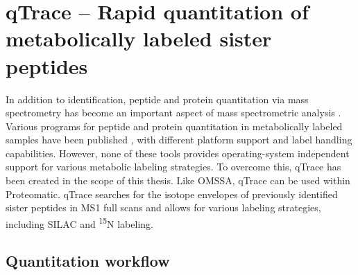 \cleardoublepage
\chapter{qTrace -- Rapid quantitation of metabolically labeled sister peptides}
\label{appendix-qtrace}

In addition to identification, peptide and protein quantitation via mass 
spectrometry has become an important aspect of mass spectrometric analysis 
\citep{Kline2010, Schulze2010}. 
Various programs for peptide and protein quantitation in metabolically labeled 
samples have been published \citep{Han2001, Li2003, Saito2007, Park2008, 
Cox2008, Mortensen2010}, with different platform support and label handling 
capabilities. 
However, none of these tools provides operating-system independent support
for various metabolic labeling strategies.
To overcome this, qTrace has been created in the scope of this thesis.
Like OMSSA, qTrace can be 
used within Proteomatic.
qTrace searches for the isotope envelopes of previously identified sister 
peptides in MS1 full scans and allows for various labeling strategies, 
including SILAC and \textsuperscript{15}N labeling.

\section*{Quantitation workflow}

